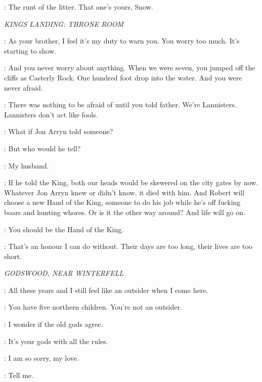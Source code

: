 
\THEON: The runt of the litter. That one's yours, Snow. 


\scene

\textit{KINGS LANDING: THRONE ROOM} 


\JAIME: As your brother, I feel it's my duty to warn you. You worry too much. It's starting to show. 

\CERSEI: And you never worry about anything. When we were seven, you jumped off the cliffs as Casterly Rock. One hundred foot drop into the water. And you were never afraid. 

\JAIME: There was nothing to be afraid of until you told father.  We're Lannisters. Lannisters don't act like fools. 

\CERSEI: What if Jon Arryn told someone? 

\JAIME: But who would he tell? 

\CERSEI: My husband. 

\JAIME: If he told the King, both our heads would be skewered on the city gates by now. Whatever Jon Arryn knew or didn't know, it died with him. And Robert will choose a new Hand of the King, someone to do his job while he's off fucking boars and hunting whores. Or is it the other way around? And life will go on. 

\CERSEI: You should be the Hand of the King. 

\JAIME: That's an honour I can do without. Their days are too long, their lives are too short. 


\scene

\textit{GODSWOOD, NEAR WINTERFELL} 


\CATELYN: All these years and I still feel like an outsider when I come here. 

\NED: You have five northern children. You're not an outsider. 

\CATELYN: I wonder if the old gods agree. 

\NED: It's your gods with all the rules. 

\CATELYN: I am so sorry, my love. 

\NED: Tell me. 

